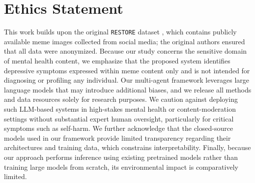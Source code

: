 \documentclass[letterpaper]{article} %
\begin{document}
\section*{Ethics Statement}
This work builds upon the original \texttt{RESTORE} dataset \cite{Yadav-etal-2023-towards}, which contains publicly available meme images collected from social media; the original authors ensured that all data were anonymized. Because our study concerns the sensitive domain of mental health content, we emphasize that the proposed system identifies depressive symptoms expressed within meme content only and is not intended for diagnosing or profiling any individual. Our multi-agent framework leverages large language models that may introduce additional biases, and we release all methods and data resources solely for research purposes. We caution against deploying such LLM-based systems in high-stakes mental health or content-moderation settings without substantial expert human oversight, particularly for critical symptoms such as self-harm. We further acknowledge that the closed-source models used in our framework provide limited transparency regarding their architectures and training data, which constrains interpretability. Finally, because our approach performs inference using existing pretrained models rather than training large models from scratch, its environmental impact is comparatively limited.

\small
% 



% 
\end{document}
